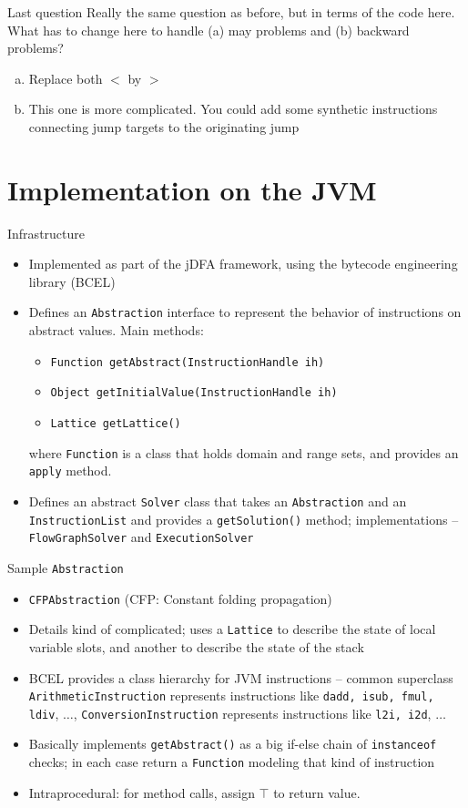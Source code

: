 \documentclass{beamer}
\begin{document}
\begin{frame}{Last question}
Really the same question as before, but in terms of the code here. What
has to change here to handle (a) may problems and (b) backward problems?
\begin{enumerate}[(a)]
\pause
\item Replace both $<$ by $>$
\pause
\item This one is more complicated. You could add some synthetic
instructions connecting jump targets to the originating jump
\end{enumerate}
\end{frame}

\section{Implementation on the JVM}

\begin{frame}{Infrastructure}
\begin{itemize}
\item Implemented as part of the jDFA framework, using the bytecode
engineering library (BCEL)
\item Defines an {\tt Abstraction} interface to represent the behavior
of instructions on abstract values. Main methods:
\begin{itemize}
\item {\tt Function getAbstract(InstructionHandle ih)}
\item {\tt Object getInitialValue(InstructionHandle ih)}
\item {\tt Lattice getLattice()}
\end{itemize}
where {\tt Function} is a class that holds domain and range sets, and
provides an {\tt apply} method.
\item Defines an abstract {\tt Solver} class that takes an {\tt Abstraction}
and an {\tt InstructionList} and provides a {\tt getSolution()} method;
implementations -- {\tt FlowGraphSolver} and {\tt ExecutionSolver}
\end{itemize}
\end{frame}

\begin{frame}{Sample {\tt Abstraction}}
\begin{itemize}
\item {\tt CFPAbstraction} (CFP: Constant folding propagation)
\item Details kind of complicated; uses a {\tt Lattice} to describe the
state of local variable slots, and another to describe the state of the
stack
\item BCEL provides a class hierarchy for JVM instructions -- common
superclass {\tt ArithmeticInstruction} represents instructions like
{\tt dadd, isub, fmul, ldiv}, $\dots$, {\tt ConversionInstruction}
represents instructions like {\tt l2i, i2d}, $\dots$
\item Basically implements {\tt getAbstract()} as a big if-else chain
of {\tt instanceof} checks; in each case return a {\tt Function} modeling
that kind of instruction
\item Intraprocedural: for method calls, assign $\top$ to return value.
\end{itemize}
\end{frame}
\end{document}
